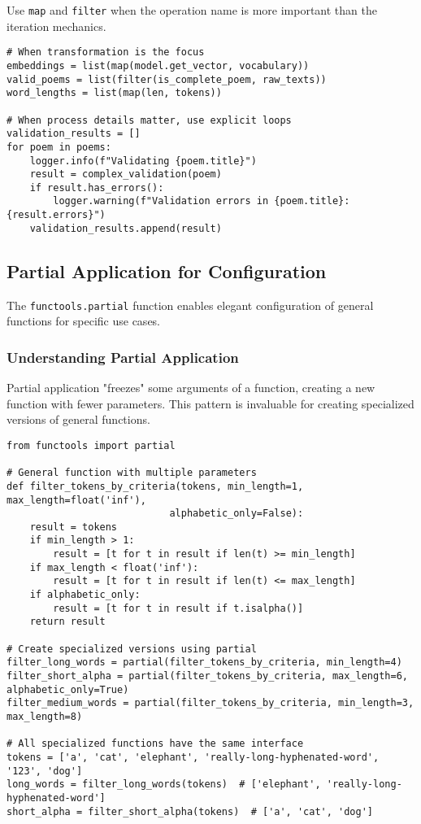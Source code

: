 \documentclass[11pt,a4paper]{article}
\begin{document}
Use \texttt{map} and \texttt{filter} when the operation name is more important than the iteration mechanics.

\begin{lstlisting}[caption=Functional transformations for clarity]
# When transformation is the focus
embeddings = list(map(model.get_vector, vocabulary))
valid_poems = list(filter(is_complete_poem, raw_texts))
word_lengths = list(map(len, tokens))

# When process details matter, use explicit loops
validation_results = []
for poem in poems:
    logger.info(f"Validating {poem.title}")
    result = complex_validation(poem)
    if result.has_errors():
        logger.warning(f"Validation errors in {poem.title}: {result.errors}")
    validation_results.append(result)
\end{lstlisting}

\subsection{Partial Application for Configuration}

The \texttt{functools.partial} function enables elegant configuration of general functions for specific use cases.

\subsubsection{Understanding Partial Application}

Partial application "freezes" some arguments of a function, creating a new function with fewer parameters. This pattern is invaluable for creating specialized versions of general functions.

\begin{lstlisting}[caption=Basic partial application]
from functools import partial

# General function with multiple parameters
def filter_tokens_by_criteria(tokens, min_length=1, max_length=float('inf'), 
                            alphabetic_only=False):
    result = tokens
    if min_length > 1:
        result = [t for t in result if len(t) >= min_length]
    if max_length < float('inf'):
        result = [t for t in result if len(t) <= max_length]
    if alphabetic_only:
        result = [t for t in result if t.isalpha()]
    return result

# Create specialized versions using partial
filter_long_words = partial(filter_tokens_by_criteria, min_length=4)
filter_short_alpha = partial(filter_tokens_by_criteria, max_length=6, alphabetic_only=True)
filter_medium_words = partial(filter_tokens_by_criteria, min_length=3, max_length=8)

# All specialized functions have the same interface
tokens = ['a', 'cat', 'elephant', 'really-long-hyphenated-word', '123', 'dog']
long_words = filter_long_words(tokens)  # ['elephant', 'really-long-hyphenated-word']
short_alpha = filter_short_alpha(tokens)  # ['a', 'cat', 'dog']
\end{lstlisting}
\end{document}
